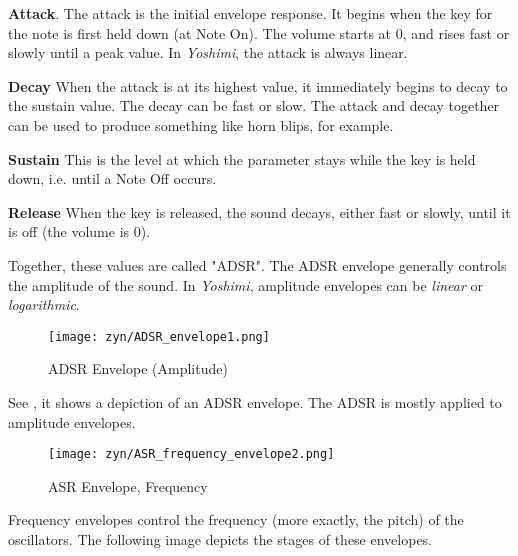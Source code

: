    \begin{enumber}
      \item \textbf{Attack}.
         \label{ref:attack}
         The attack is the initial envelope response. 
         It begins when the key for the note is first held down
         (at Note On).
         The volume starts at 0, and rises fast or slowly until a peak value.
         In \textsl{Yoshimi}, the attack is always linear.
      \item \textbf{Decay}
         \label{ref:decay}
         When the attack is at its highest value, it immediately begins
         to decay to the sustain value.  The decay can be fast or slow.
         The attack and decay together can be used to produce something like
         horn blips, for example.
      \item \textbf{Sustain}
         \label{ref:sustain}
         This is the level at which the parameter stays while the key is
         held down, i.e. until a Note Off occurs.
      \item \textbf{Release}
         \label{ref:release}
         When the key is released, the sound decays, either fast or slowly,
         until it is off (the volume is 0).
   \end{enumber}

   Together, these values are called "ADSR".  
   The ADSR envelope generally controls the amplitude of the sound.
   In \textsl{Yoshimi},
   amplitude envelopes can be \textsl{linear} or \textsl{logarithmic}.

\begin{figure}[H]
   \centering 
   \texttt{[image: zyn/ADSR\_envelope1.png]}
   \caption{ADSR Envelope (Amplitude)}
   \label{fig:adsr_envelope_depiction}
\end{figure}

   See ,
   it shows a depiction of an ADSR envelope.
   The ADSR is mostly applied to amplitude envelopes.

\begin{figure}[H]
   \centering 
   \texttt{[image: zyn/ASR\_frequency\_envelope2.png]}
   \caption{ASR Envelope, Frequency}
   \label{fig:asr_envelope_depiction}
\end{figure}

   Frequency envelopes control the frequency (more exactly, the pitch) of the
   oscillators. The following image depicts the stages of these envelopes.

